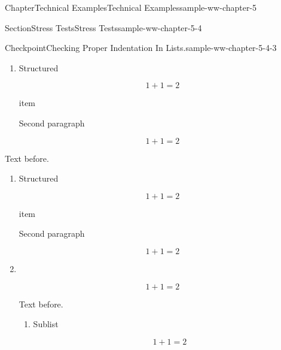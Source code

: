 \documentclass[oneside,10pt,]{book}
\numberwithin{equation}{section}
\begin{document}
\begin{chapterptx}{Chapter}{Technical Examples}{}{Technical Examples}{}{}{sample-ww-chapter-5}
\begin{sectionptx}{Section}{Stress Tests}{}{Stress Tests}{}{}{sample-ww-chapter-5-4}
\begin{inlineexercise}{Checkpoint}{Checking Proper Indentation In Lists.}{sample-ww-chapter-5-4-3}
\begin{enumerate}[label={\alph*.}]
\begin{enumerate}[label={\alph*.}]
%
\par
Sublist Item%
\par
Second%
\par
%
\begin{equation*}
1+1=2
\end{equation*}
%
\par
paragraph%
\item{}Sublist Item%
\par
%
\begin{equation*}
1+1=2
\end{equation*}
%
\par
%
\begin{equation*}
1+1=2
\end{equation*}
%
\par
Second paragraph%
\end{enumerate}
%
\item{}Structured%
\par
%
\begin{equation*}
1+1=2
\end{equation*}
%
\par
item%
\par
Second paragraph%
\par
%
\begin{equation*}
1+1=2
\end{equation*}
%
\end{enumerate}
%
\par
Text before.%
\begin{enumerate}[label={\alph*.}]
\item{}Structured%
\par
%
\begin{equation*}
1+1=2
\end{equation*}
%
\par
item%
\par
Second paragraph%
\par
%
\begin{equation*}
1+1=2
\end{equation*}
%
\item{}~%
\par
%
\begin{equation*}
1+1=2
\end{equation*}
%
\par
Text before.%
\begin{enumerate}[label={\Alph*.}]
\item{}Sublist%
\par
%
\begin{equation*}
1+1=2
\end{equation*}

\end{enumerate}
\end{enumerate}
\end{inlineexercise}
\end{sectionptx}
\end{chapterptx}
\end{document}

